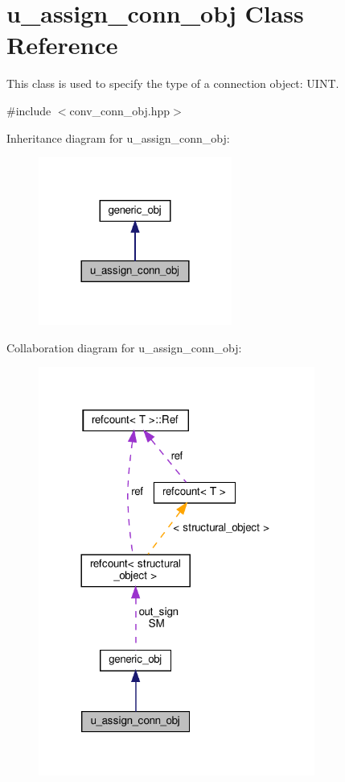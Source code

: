 \hypertarget{classu__assign__conn__obj}{}\section{u\+\_\+assign\+\_\+conn\+\_\+obj Class Reference}
\label{classu__assign__conn__obj}


This class is used to specify the type of a connection object\+: U\+I\+NT.  




{\ttfamily \#include $<$conv\+\_\+conn\+\_\+obj.\+hpp$>$}



Inheritance diagram for u\+\_\+assign\+\_\+conn\+\_\+obj\+:
\nopagebreak
\begin{figure}[H]
\begin{center}
\leavevmode
\includegraphics[width=180pt]{db/deb/classu__assign__conn__obj__inherit__graph}
\end{center}
\end{figure}


Collaboration diagram for u\+\_\+assign\+\_\+conn\+\_\+obj\+:
\nopagebreak
\begin{figure}[H]
\begin{center}
\leavevmode
\includegraphics[width=257pt]{da/db5/classu__assign__conn__obj__coll__graph}
\end{center}
\end{figure}
